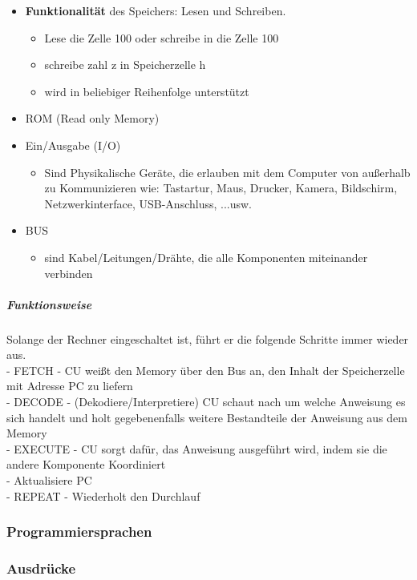 \begin{itemize}
	\item \textbf{Funktionalität} des Speichers: Lesen und Schreiben.
	\begin{itemize}
		\item Lese die Zelle 100 oder schreibe in die Zelle 100
		\item schreibe zahl z in Speicherzelle h
		\item wird in beliebiger Reihenfolge unterstützt
	\end{itemize}
	
	\item ROM (Read only Memory)
	
	\item Ein/Ausgabe (I/O)
	\begin{itemize}
		\item Sind Physikalische Geräte, die erlauben mit dem Computer von außerhalb zu Kommunizieren wie: Tastartur, Maus, Drucker, Kamera, Bildschirm, Netzwerkinterface, USB-Anschluss, ...usw.
	\end{itemize}
	
	\item BUS
	\begin{itemize}
		\item sind Kabel/Leitungen/Drähte, die alle Komponenten miteinander verbinden
	\end{itemize}
\end{itemize}

\subparagraph{\textbf{Funktionsweise}}
Solange der Rechner eingeschaltet ist, führt er die folgende Schritte immer wieder aus. \\
- FETCH - CU weißt den Memory über den Bus an, den Inhalt der Speicherzelle mit Adresse PC zu liefern \\
- DECODE - (Dekodiere/Interpretiere) CU schaut nach um welche Anweisung es sich handelt und holt gegebenenfalls weitere Bestandteile der Anweisung aus dem Memory \\
- EXECUTE - CU sorgt dafür, das Anweisung ausgeführt wird, indem sie die andere Komponente Koordiniert \\
- Aktualisiere PC \\
- REPEAT - Wiederholt den Durchlauf \\

\subsubsection{Programmiersprachen}

\subsubsection{Ausdrücke}

